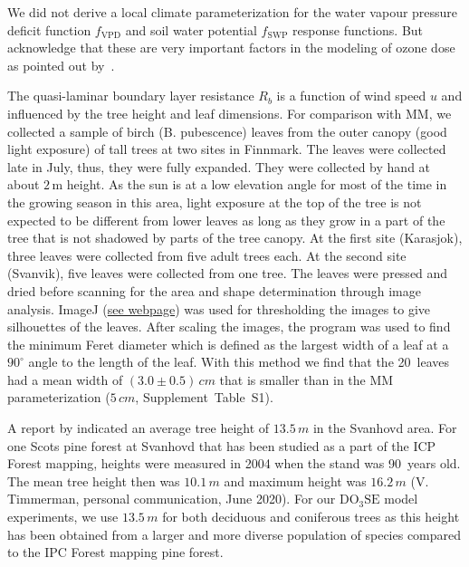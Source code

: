 \documentclass[bg, manuscript]{copernicus}
\begin{document}
We did not  derive a local climate parameterization for the water vapour pressure deficit function $f_\mathrm{VPD}$ and soil water potential $f_\mathrm{SWP}$ response functions. But acknowledge that these are very important factors in the modeling of ozone dose as pointed out by~\citet{ACP:Bueker2012}.

The quasi-laminar boundary layer resistance $R_b$ is a function of wind speed $u$ and influenced by the tree height and leaf dimensions. For comparison with MM, we collected a sample of birch (B. pubescence) leaves from the outer canopy (good light exposure) of tall trees at two sites in Finnmark. The leaves were collected late in July, thus, they were fully expanded. They were collected by hand at about $2\,\mathrm{m}$ height. As the sun is at a low elevation angle for most of the time in the growing season in this area, light exposure at the top of the tree is not expected to be different from lower leaves as long as they grow in a part of the tree that is not shadowed by parts of the tree canopy. At the first site (Karasjok), three leaves were collected from five adult trees each. At the second site (Svanvik), five leaves were collected from one tree. The leaves were pressed and dried before scanning for the area and shape determination through image analysis. ImageJ (\href{https://imagej.nih.gov/ij/}{see webpage}) was used for thresholding the images to give silhouettes of the leaves. After scaling the images, the program was used to find the minimum Feret diameter which is defined as the largest width of a leaf at a $90^\circ$ angle to the length of the leaf. With this method we find that the 20~leaves had a mean width of $(3.0\pm 0.5)\,\unit{cm}$ that is smaller than in the MM parameterization ($5\,\unit{cm}$, Supplement~Table~S1). 

A report by \citet[][p.~52]{NINA2004} indicated an average tree height of $13.5\,\unit{m}$ in the Svanhovd area. For one Scots pine forest at Svanhovd that has been studied as a part of the ICP Forest mapping, heights were measured in 2004 when the stand was 90~years old. The mean tree height then was $10.1\,\unit{m}$ and maximum height was $16.2\,\unit{m}$ (V. Timmerman, personal communication, June 2020). For our $\mathrm{DO_3SE}$ model experiments, we use $13.5\,\unit{m}$ for both deciduous and coniferous trees as this height has been obtained from a larger and more diverse population of species compared to the IPC Forest mapping pine forest.
\end{document}
